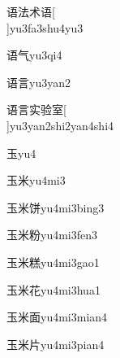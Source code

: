 \begin{verbete}[9;8;5;9]{语法术语}[\\]{yu3fa3shu4yu3}
\end{verbete}

\begin{verbete}[9;4]{语气}{yu3qi4}
\end{verbete}

\begin{verbete}[9;7]{语言}{yu3yan2}
\end{verbete}

\begin{verbete}[9;7;8;10;9]{语言实验室}[\\]{yu3yan2shi2yan4shi4}
\end{verbete}

\begin{verbete}[5]{玉}{yu4}
\end{verbete}

\begin{verbete}[5;6]{玉米}{yu4mi3}
\end{verbete}

\begin{verbete}[5;6;9]{玉米饼}{yu4mi3bing3}
\end{verbete}

\begin{verbete}[5;6;10]{玉米粉}{yu4mi3fen3}
\end{verbete}

\begin{verbete}[5;6;16]{玉米糕}{yu4mi3gao1}
\end{verbete}

\begin{verbete}[5;6;7]{玉米花}{yu4mi3hua1}
\end{verbete}

\begin{verbete}[5;6;9]{玉米面}{yu4mi3mian4}
\end{verbete}

\begin{verbete}[5;6;4]{玉米片}{yu4mi3pian4}
\end{verbete}

